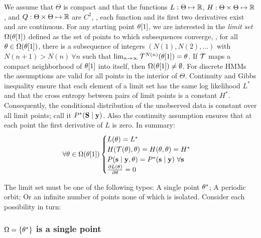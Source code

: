 We assume that $\Theta$ is compact and that the functions $L:\Theta
\mapsto \mathbb{R}$, $H:\Theta \times \Theta \mapsto \mathbb{R}$, and $Q:\Theta
\times \Theta \mapsto \mathbb{R}$ are $C^2$, \ie, each function and its
first two derivatives exist and are continuous.  For any starting
point ${\theta}{[1]}$, we are interested in the \emph{limit set}
$\Omega({\theta}{[1]})$ defined as the set of points to which
subsequences converge, \ie, for all $\theta \in
\Omega({\theta}{[1]})$, there is a subsequence of integers
$\left( N(1), N(2), \ldots \right)$ with $N(n+1) > N(n)~ \forall
n$ such that $\lim_{n \rightarrow \infty}
\EMmap^{N(n)}(\ti{\parameters}{1}) = \parameters$.  If $\EMmap$ maps a
compact neighborhood of ${\theta}{[1]}$ into itself, then
$\Omega({\theta}{[1]}) \neq \emptyset$.  For discrete HMMs the
assumptions are valid for all points in the interior of $\Theta$.
Continuity and Gibbs inequality ensure that each element of a limit
set has the same log likelihood $L^*$ and that the cross entropy
between pairs of limit points is a constant $H^*$.  Consequently, the
conditional distribution of the unobserved data is constant over all
limit points; call it $P^*({\bf S}\mid \mathbf{y})$.  Also the continuity assumption
ensures that at each point the first derivative of $L$ is zero.  In
summary:
\begin{equation}
  \label{eq:OmegaFlat}
  \forall \parameters \in \Omega(\ti{\parameters}{1})
  \begin{cases}
    L(\parameters) = L^*\\
    H(\EMmap(\parameters), \parameters) = H(\parameters, \parameters) = H^* \\
    P(\s\given \y,\parameters) = P^*(\s\given \y)~\forall \s \\
    \frac{\partial L(\parameters)}{\partial \parameters} = 0
  \end{cases}
\end{equation}

The limit set must be one of the following types: A single point
$\theta^*$; A periodic orbit; Or an infinite number of points
none of which is isolated.  Consider each possibility in turn:

\subsubsection{$\Omega = \{\theta^*\}$ is a single point}
\label{sec:EMsingle}

